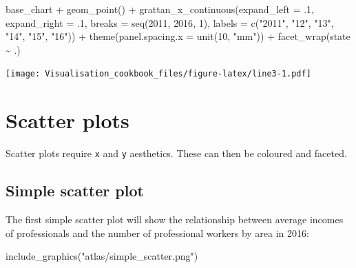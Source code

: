 \documentclass[
]{book}
\newenvironment{Shaded}{\begin{snugshade}}{\end{snugshade}}
\newcommand{\AttributeTok}[1]{\textcolor[rgb]{0.77,0.63,0.00}{#1}}
\newcommand{\DecValTok}[1]{\textcolor[rgb]{0.00,0.00,0.81}{#1}}
\newcommand{\FunctionTok}[1]{\textcolor[rgb]{0.00,0.00,0.00}{#1}}
\newcommand{\NormalTok}[1]{#1}
\newcommand{\SpecialCharTok}[1]{\textcolor[rgb]{0.00,0.00,0.00}{#1}}
\newcommand{\StringTok}[1]{\textcolor[rgb]{0.31,0.60,0.02}{#1}}
\begin{document}
\begin{Shaded}
\begin{Highlighting}[]
\NormalTok{base\_chart }\SpecialCharTok{+}
  \FunctionTok{geom\_point}\NormalTok{() }\SpecialCharTok{+}
    \FunctionTok{grattan\_x\_continuous}\NormalTok{(}\AttributeTok{expand\_left =}\NormalTok{ .}\DecValTok{1}\NormalTok{, }
                         \AttributeTok{expand\_right =}\NormalTok{ .}\DecValTok{1}\NormalTok{,}
                         \AttributeTok{breaks =} \FunctionTok{seq}\NormalTok{(}\DecValTok{2011}\NormalTok{, }\DecValTok{2016}\NormalTok{, }\DecValTok{1}\NormalTok{),}
                         \AttributeTok{labels =} \FunctionTok{c}\NormalTok{(}\StringTok{"2011"}\NormalTok{, }\StringTok{"12"}\NormalTok{, }\StringTok{"13"}\NormalTok{, }\StringTok{"14"}\NormalTok{, }\StringTok{"15"}\NormalTok{, }\StringTok{"16"}\NormalTok{)) }\SpecialCharTok{+} 
  \FunctionTok{theme}\NormalTok{(}\AttributeTok{panel.spacing.x =} \FunctionTok{unit}\NormalTok{(}\DecValTok{10}\NormalTok{, }\StringTok{"mm"}\NormalTok{)) }\SpecialCharTok{+} 
  \FunctionTok{facet\_wrap}\NormalTok{(state }\SpecialCharTok{\textasciitilde{}}\NormalTok{ .)}
\end{Highlighting}
\end{Shaded}

\texttt{[image: Visualisation\_cookbook\_files/figure-latex/line3-1.pdf]}

\hypertarget{scatter-plots}{%
\section{Scatter plots}\label{scatter-plots}}

Scatter plots require \texttt{x} and \texttt{y} aesthetics. These can then be coloured and faceted.

\hypertarget{simple-scatter-plot}{%
\subsection{Simple scatter plot}\label{simple-scatter-plot}}

The first simple scatter plot will show the relationship between average incomes of professionals and the number of professional workers by area in 2016:

\begin{Shaded}
\begin{Highlighting}[]
\FunctionTok{include\_graphics}\NormalTok{(}\StringTok{"atlas/simple\_scatter.png"}\NormalTok{)}
\end{Highlighting}
\end{Shaded}
\end{document}
